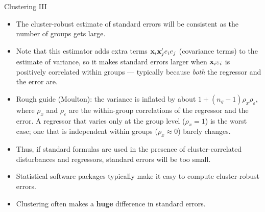 \documentclass[aspectratio=169,11pt]{beamer}
\begin{document}
\begin{frame}{Clustering III}
\small
\begin{itemize}
	\item The cluster-robust estimate of standard errors will be consistent as the number of groups 
	gets large.

	\item Note that this estimator adds extra terms ${\bf x}_i {\bf x}_j' e_i e_j$ (covariance terms) to the estimate of variance,
	so it makes standard errors larger when ${\bf x}_i \varepsilon_i$ is positively correlated within groups
	--- typically because \emph{both} the regressor and the error are.

	\item Rough guide (Moulton): the variance is inflated by about $1 + \left(n_g - 1\right)\rho_x \rho_\varepsilon$,
	where $\rho_x$ and $\rho_\varepsilon$ are the within-group correlations of the regressor and the error.
	A regressor that varies only at the group level ($\rho_x = 1$) is the worst case; one that is independent
	within groups ($\rho_x \approx 0$) barely changes.

	\item Thus, if standard formulas are used in the presence of cluster-correlated disturbances
	and regressors, standard errors will be too small.

	\item Statistical software packages typically make it easy to compute cluster-robust errors.
	
	\item Clustering often makes a {\bf huge} difference in standard errors.

\end{itemize}
\end{frame}




\end{document}
